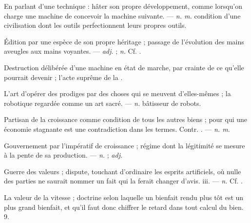  En parlant d'une technique : hâter son propre développement, comme lorsqu'on charge une machine de concevoir la machine suivante.  ---  \textit{n. m.} condition d'une civilisation dont les outils perfectionnent leurs propres outils.

 Édition par une espèce de son propre héritage ; passage de l'évolution des mains aveugles aux mains voyantes. ---  \textit{adj.} ;  \textit{n.} Cf. .

 Destruction délibérée d'une machine en état de marche, par crainte de ce qu'elle pourrait devenir ; l'acte suprême de la .

 L'art d'opérer des prodiges par des choses qui se meuvent d'elles-mêmes ; la robotique regardée comme un art sacré. ---  \textit{n.} bâtisseur de robots.

 Partisan de la croissance comme condition de tous les autres biens ; pour qui une économie stagnante est une contradiction dans les termes. Contr. . ---  \textit{n. m.}

 Gouvernement par l'impératif de croissance ; régime dont la légitimité se mesure à la pente de sa production. ---  \textit{n.} ;  \textit{adj.}

 Guerre des valeurs ; dispute, touchant d'ordinaire les esprits artificiels, où nulle des parties ne saurait nommer un fait qui la ferait changer d'avis.   iii. ---  \textit{n.} Cf. .

 La valeur de la vitesse ; doctrine selon laquelle un bienfait rendu plus tôt est un plus grand bienfait, et qu'il faut donc chiffrer le retard dans tout calcul du bien.   9.

